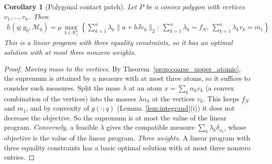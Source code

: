 \documentclass[11pt,a4paper]{article}
\theoremstyle{plain}
\newtheorem{corollary}[theorem]{Corollary}
\newtheorem{remark}[theorem]{Remark}
\newcommand{\R}{\mathbb{R}}
\begin{document}
\begin{corollary}[Polygonal contact patch]
\label{cor:coarse_upper_polygon}
    Let $P$ be a convex polygon with vertices $v_1,\ldots,v_n$. Then
    \begin{align}
    \boxed{
    \overline h(q;y_0,\mathcal M_0)
    =
    \mu\max_{\lambda\in\R^n_+}\left\{\sum_{k=1}^n\lambda_k\|a+bJv_k\|_2:\ \sum_{k=1}^n\lambda_k=f_N,\ \sum_{k=1}^n\lambda_kv_k=m_1\right\}}
    \end{align}
    This is a linear program with three equality constraints, so it has an optimal solution with at most three nonzero weights.
\end{corollary}
\begin{proof}
    \textit{Moving mass to the vertices.} By Theorem~\ref{prop:coarse_upper_atomic}, the supremum is attained by a measure with at most three atoms, so it suffices to consider such measures.
    Split the mass $\lambda$ at an atom $x=\sum_k\alpha_kv_k$ (a convex combination of the vertices) into the masses $\lambda\alpha_k$ at the vertices $v_k$. This keeps $f_N$ and $m_1$, and by
    convexity of $g(\cdot;q)$ (Lemma~\ref{lem:integrand}(i)) it does not decrease the objective. So the supremum is at most the value of the linear program.
    \textit{Conversely,} a feasible $\lambda$ gives the compatible measure $\sum_k\lambda_k\delta_{v_k}$, whose objective is the value of the linear program.
    \textit{Three weights.} A linear program with three equality constraints has a basic optimal solution with at most three nonzero entries.
\end{proof}

\end{document}
